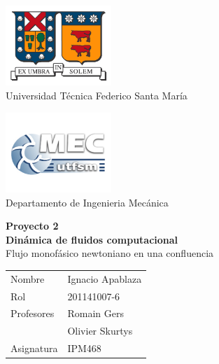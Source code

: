 \documentclass[12pt, a4paper]{article}
\begin{document}
\thispagestyle{empty}

\hspace{-5mm}
\begin{minipage}[c]{7cm}
\centering
\includegraphics[width=4cm]{logoutfsm.jpg} \\
Universidad Técnica Federico Santa María
\end{minipage}
\hfill
\hspace{20mm}
\begin{minipage}[c]{7cm}
\centering
\includegraphics[width=4cm]{logomec1.jpg} \\
Departamento de Ingenieria Mecánica
\end{minipage}

\begin{center}
\vfill
 \Huge{{\bf Proyecto 2 }} \\ 
 \Huge{ {\bf Dinámica de fluidos computacional}} \\ \vspace{1cm}
 \Large{Flujo monofásico newtoniano en una confluencia}
\vfill
\end{center}

\vfill \hfill
\begin{tabular}{l @{ : } l}
Nombre &   Ignacio Apablaza \\
Rol & 201141007-6  \\
Profesores & Romain Gers \\
			& Olivier Skurtys \\
Asignatura & IPM468 \\
\end{tabular}

\newpage


\tableofcontents


\newpage


\newpage
\end{document}
